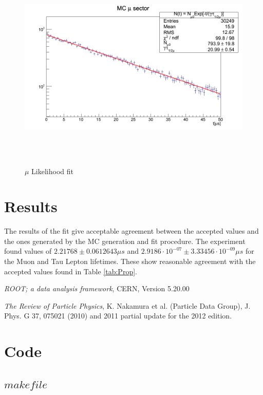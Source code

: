 \documentclass[aps,prl,groupedaddress]{revtex4}
\begin{document}
\begin{figure}[htp]
\centering
\includegraphics[height=100mm]{Muon_MC.png}
\caption{$\mu$ Likelihood fit}
\label{fig:Muon}
\end{figure}

\section{Results}
The results of the fit give acceptable agreement between the accepted values and the ones generated by the MC generation and fit procedure. The experiment found values of 
$2.21768 \pm 0.0612643 \mu s$ and $2.9186 \cdot 10^{-07} \pm 3.33456 \cdot 10^{-09} \mu s$ for the Muon and Tau Lepton lifetimes.  These show reasonable agreement with the accepted values found in Table \ref{tab:Prop}.
\begin{thebibliography}{2}

\emph{ROOT; a data analysis framework}, CERN, Version 5.20.00

\emph{The Review of Particle Physics}, K. Nakamura et al. (Particle Data Group), J. Phys. G 37, 075021 (2010) and 2011 partial update for the 2012 edition.

\end{thebibliography}

\section{Code}
\subsection{$makefile$}
\end{document}
